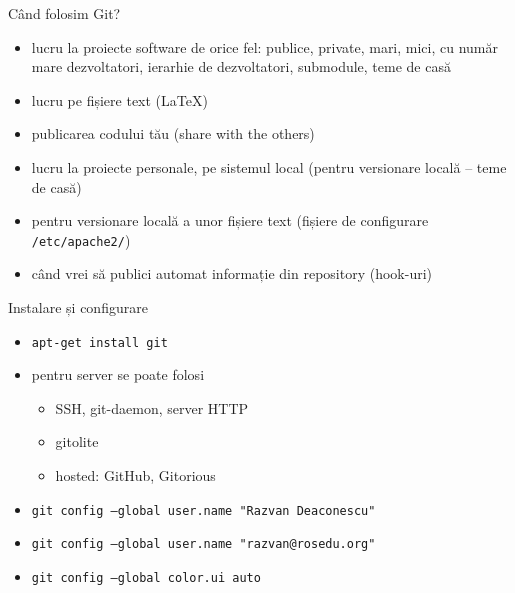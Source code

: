 \documentclass{beamer}
\begin{document}
\begin{frame}{Când folosim Git?}
  \begin{itemize}
    \item lucru la proiecte software de orice fel: publice, private, mari,
    mici, cu număr mare dezvoltatori, ierarhie de dezvoltatori, submodule,
    teme de casă
    \item lucru pe fișiere text (LaTeX)
    \item publicarea codului tău (share with the others)
    \item lucru la proiecte personale, pe sistemul local (pentru versionare
    locală -- teme de casă)
    \item pentru versionare locală a unor fișiere text (fișiere de configurare
    \texttt{/etc/apache2/})
    \item când vrei să publici automat informație din repository (hook-uri)
  \end{itemize}
\end{frame}

\begin{frame}{Instalare și configurare}
  \begin{itemize}
    \item \texttt{apt-get install git}
    \item pentru server se poate folosi
      \begin{itemize}
        \item SSH, git-daemon, server HTTP
        \item gitolite
        \item hosted: GitHub, Gitorious
      \end{itemize}
    \item \texttt{git config --global user.name "Razvan Deaconescu"}
    \item \texttt{git config --global user.name "razvan@rosedu.org"}
    \item \texttt{git config --global color.ui auto}
  \end{itemize}
\end{frame}
\end{document}
